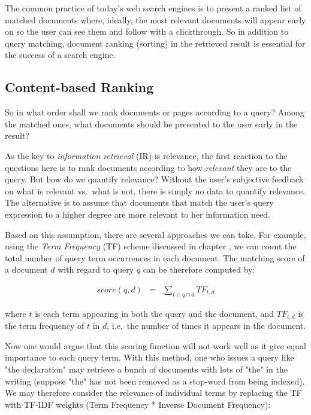 \documentclass[
  letterpaper,
]{scrbook}
\begin{document}
The common practice of today's web search engines is to present a ranked
list of matched documents where, ideally, the most relevant documents
will appear early on so the user can see them and follow with a
clickthrough. So in addition to query matching, document ranking
(sorting) in the retrieved result is essential for the success of a
search engine.

\subsection{Content-based Ranking}\label{content-based-ranking}

So in what order shall we rank documents or pages according to a query?
Among the matched ones, what documents should be presented to the user
early in the result?

As the key to \emph{information retrieval} (IR) is relevance, the first
reaction to the questions here is to rank documents according to how
\emph{relevant} they are to the query. But how do we quantify relevance?
Without the user's subjective feedback on what is relevant vs.~what is
not, there is simply no data to quantify relevance. The alternative is
to assume that documents that match the user's query expression to a
higher degree are more relevant to her information need.

Based on this assumption, there are several approaches we can take. For
example, using the \emph{Term Frequency} (TF) scheme discussed in
chapter , we can count the total number of query term occurrences in
each document. The matching score of a document \(d\) with regard to
query \(q\) can be therefore computed by:

\[\begin{aligned}
score(q,d) & = & \sum_{t \in q \cap d} TF_{t,d}
\end{aligned}\]

where \(t\) is each term appearing in both the query and the document,
and \(TF_{t,d}\) is the term frequency of \(t\) in \(d\), i.e.~the
number of times it appears in the document.

Now one would argue that this scoring function will not work well as it
give equal importance to each query term. With this method, one who
issues a query like "the declaration" may retrieve a bunch of documents
with lots of "the" in the writing (suppose "the" has not been removed as
a stop-word from being indexed). We may therefore consider the relevance
of individual terms by replacing the TF with TF-IDF weights (Term
Frequency * Inverse Document Frequency):
\end{document}
